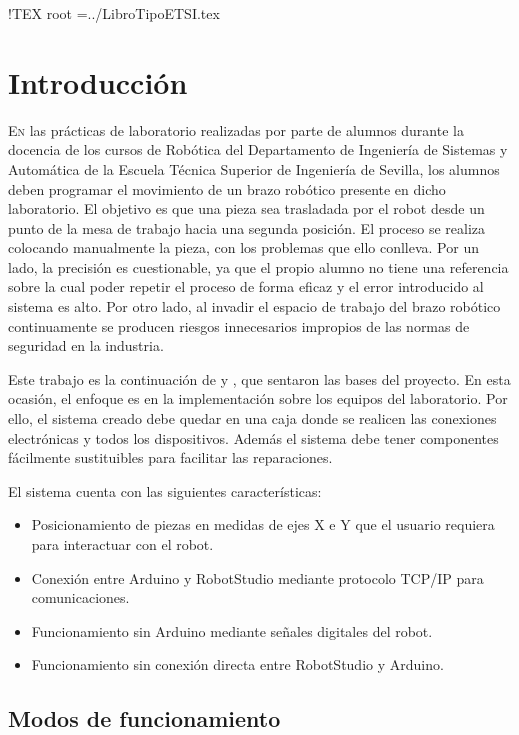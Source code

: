 !TEX root =../LibroTipoETSI.tex
\chapter{Introducción}\label{chp-01}


\lettrine[lraise=-0.1, lines=2, loversize=0.2]{E}{n} las prácticas de laboratorio realizadas
por parte de alumnos durante la docencia de los cursos de Robótica del Departamento de Ingeniería
de Sistemas y Automática de la Escuela Técnica Superior de Ingeniería de Sevilla, los alumnos
deben programar el movimiento de un brazo robótico presente en dicho laboratorio. El objetivo
es que una pieza sea trasladada por el robot desde un punto de la mesa de trabajo hacia una
segunda posición. El proceso se realiza colocando manualmente la pieza, con los problemas que
ello conlleva. Por un lado, la precisión es cuestionable, ya que el propio alumno no tiene una
referencia sobre la cual poder repetir el proceso de forma eficaz y el error introducido al sistema
es alto. Por otro lado, al invadir el espacio de trabajo del brazo robótico continuamente se
producen riesgos innecesarios impropios de las normas de seguridad en la industria.

Este trabajo es la continuación de \cite{tapia} y \cite{rea}, que sentaron las bases del proyecto.
En esta ocasión, el enfoque es en la implementación sobre los equipos del laboratorio. Por ello,
el sistema creado debe quedar en una caja donde se realicen las conexiones electrónicas y todos
los dispositivos. Además el sistema debe tener componentes fácilmente sustituibles para facilitar
las reparaciones.

El sistema cuenta con las siguientes características:
\begin{itemize}
	\item Posicionamiento de piezas en medidas de ejes X e Y que el usuario requiera para 
	interactuar con el robot.
	\item Conexión entre Arduino y RobotStudio mediante protocolo TCP/IP para comunicaciones.
	\item Funcionamiento sin Arduino mediante señales digitales del robot.
	\item Funcionamiento sin conexión directa entre RobotStudio y Arduino.
\end{itemize}

\section{Modos de funcionamiento}\label{sec-00}



